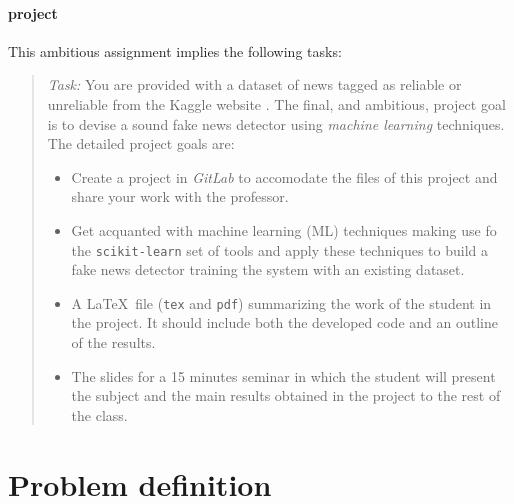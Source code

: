\documentclass[11pt,a4paper,BCOR12mm, headexclude, footexclude, twoside, openright]{scrartcl}
\begin{document}
\paragraph{project} This ambitious assignment implies the following tasks:
\begin{quotation}\emph{Task:} You are provided with a dataset of news tagged as reliable or unreliable from the Kaggle website \cite{faken_kaggle}. The final, and ambitious, project goal is to devise a sound fake news detector using \emph{machine learning} techniques. The detailed project goals are:

  \begin{itemize}
  \item Create a project in \emph{GitLab} to accomodate the files of this project and share your work with the professor. 
  \item Get acquanted with machine learning (ML) techniques making use fo the \texttt{scikit-learn} set of tools and apply these techniques to build a fake news detector training the system with an existing dataset.
  \item A \LaTeX~file (\texttt{tex} and \texttt{pdf}) summarizing the work of the student in the project. It should include both the developed code and an outline of the results.
  \item The slides for a 15 minutes seminar in which the student will present the subject and the main results obtained in the project to the rest of the class.
\end{itemize}
\end{quotation}

\newpage

{%
  \renewcommand{\headrulewidth}{0.5pt}%
  \renewcommand{\footrulewidth}{0.5pt}
  \fancyhf{}%
  \fancyhead[R]{\emph{\footnotesize \today}}
}

\thispagestyle{plain}

\section*{Problem definition} %
\end{document}
